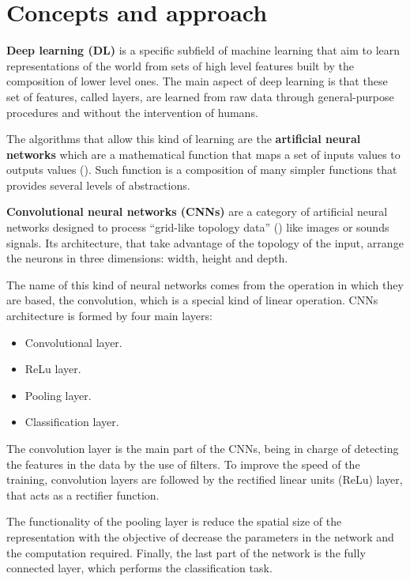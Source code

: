 \section{Concepts and approach}

\textbf{Deep learning (DL)} is a specific subfield of machine learning that aim to learn representations of the world from sets of high level features built by the composition of lower level ones. The main aspect of deep learning is that these set of features, called layers, are learned from raw data through general-purpose procedures and without the intervention of humans. 

The algorithms that allow this kind of learning are the \textbf{artificial neural networks} which are a mathematical function that maps a set of inputs values to outputs values (\cite{goodfellow2016deep}). Such function is a composition of many simpler functions that provides several levels of abstractions. 

\textbf{Convolutional neural networks (CNNs)} are a category of artificial neural networks designed to process ``grid-like topology data'' (\cite{goodfellow2016deep}) like images or sounds signals. Its architecture, that take advantage of the topology of the input, arrange the neurons in three dimensions: width, height and depth. 

The name of this kind of neural networks comes from the operation in which they are based, the convolution, which is a special kind of linear operation. CNNs architecture is formed by four main layers:

\begin{itemize}
    \item Convolutional layer.
    \item ReLu layer.
    \item Pooling layer.
    \item Classification layer.
\end{itemize}

The convolution layer is the main part of the CNNs, being in charge of detecting the features in the data by the use of filters. To improve the speed of the training, convolution layers are followed by the rectified linear units (ReLu) layer, that acts as a rectifier function.

The functionality of the pooling layer is reduce the spatial size of the representation with the objective of decrease the parameters in the network and the computation required. Finally, the last part of the network is the fully connected layer, which performs the classification task.

